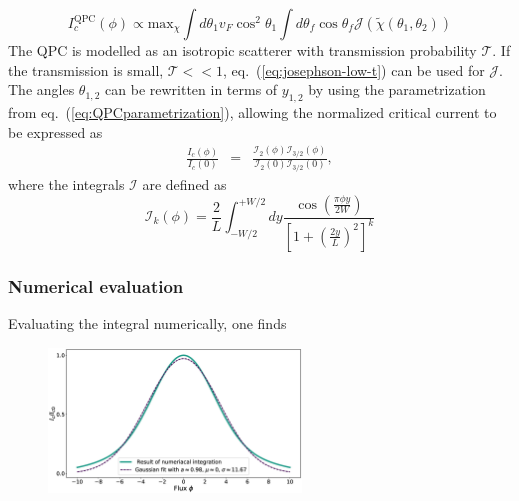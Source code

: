 \begin{equation}
I_c^{\text{QPC}}(\phi) \propto \text{max}_{\chi} \int d \theta_1 v_F \cos^2 \theta_1 \int d \theta_f \cos \theta_f \mathcal{J}\left( \tilde{\chi} (\theta_1, \theta_2) \right)
\end{equation}
The QPC is modelled as an isotropic scatterer with transmission probability $\mathcal{T}$. If the transmission is small, $\mathcal{T} << 1$, eq.~(\ref{eq:josephson-low-t}) can be used for $\mathcal{J}$.
The angles $\theta_{1, 2}$ can be rewritten in terms of $y_{1, 2}$ by using the parametrization from eq.~(\ref{eq:QPCparametrization}), allowing the normalized critical current to be expressed as
\begin{eqnarray}
\frac{I_c(\phi)}{I_c(0)} &=& \frac{\mathcal{I}_2(\phi)\mathcal{I}_{3/2}(\phi)}{\mathcal{I}_2(0)\mathcal{I}_{3/2}(0)},
\end{eqnarray}
where the integrals $\mathcal{I}$ are defined as
\begin{equation}
\mathcal{I}_k(\phi) = \frac{2}{L}\int_{-W/2}^{+W/2}dy \frac{\cos\left(\frac{\pi\phi y}{2W}\right)}{\left[1 + \left(\frac{2y}{L}\right)^2 \right]^k}
\label{integral-qpc}
\end{equation}
\subsubsection*{Numerical evaluation}

Evaluating the integral numerically, one finds 

\begin{figure}
\centering
\includegraphics[width=0.6\textwidth]{figure/analyticalmodel/qpc-numerical-integration-fit}
\end{figure}

